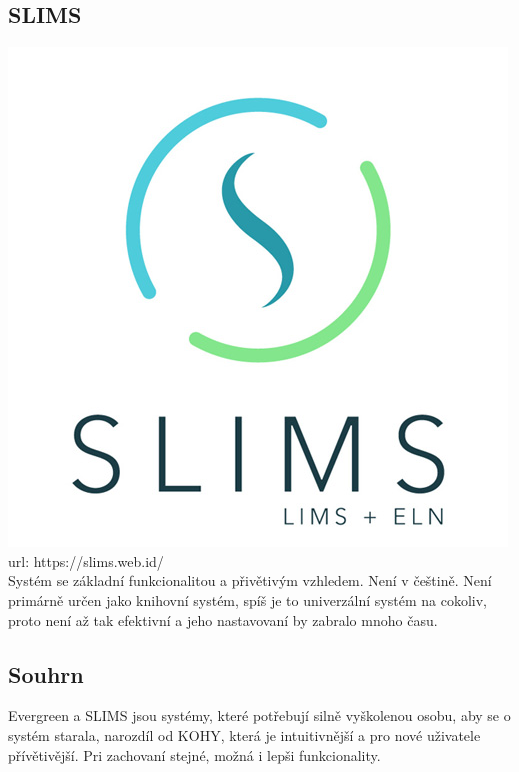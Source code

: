 \subsection{SLIMS}
\includegraphics[width=.25\textwidth]{img/Slims_Logo.png}\\
url: https://slims.web.id/\\
Systém se základní funkcionalitou a přivětivým vzhledem.
Není v češtině. Není primárně určen jako knihovní systém, spíš je to univerzální
systém na cokoliv, proto není až tak efektivní a jeho nastavovaní
by zabralo mnoho času.

\subsection{Souhrn}
Evergreen a SLIMS jsou systémy, které potřebují silně vyškolenou osobu,
aby se o systém starala, narozdíl od KOHY, která je intuitivnější a
pro nové uživatele přívětivější. Pri zachovaní stejné, možná i lepši funkcionality.\\
